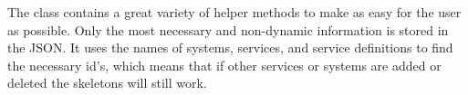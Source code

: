 The class contains a great variety of helper methods to make as easy for the user as possible. Only the most necessary 
and non-dynamic information is stored in the JSON. It uses the names of systems, services, and service definitions to find the necessary
id's, which means that if other services or systems are added or deleted the skeletons will still work. 



